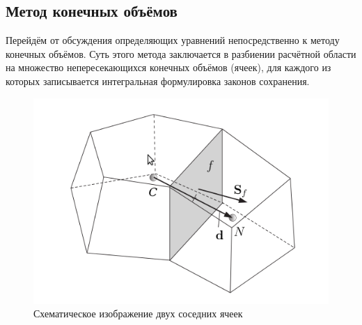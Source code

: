 	\newpage
	\subsection{Метод конечных объёмов}
		Перейдём от обсуждения определяющих уравнений непосредственно к методу конечных объёмов. Суть этого метода заключается в разбиении расчётной области на множество непересекающихся конечных объёмов (ячеек), для каждого из которых записывается интегральная формулировка законов сохранения.
		\begin{figure}
			\centering
			\includegraphics[scale=0.5]{twoCells}
			\caption{Схематическое изображение двух соседних ячеек}
			\label{fig:twoCells}
		\end{figure}
